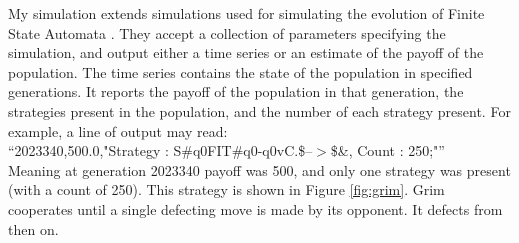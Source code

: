 \documentclass[a4paper,11pt,bcshonoursthesis,singlespace,oneside,thesisdraft,pdflatex]{cssethesis}
\begin{document}
My simulation extends simulations used for simulating the evolution of Finite State Automata \citep{van-veelen:PNAS:2012, jggit}. 
They accept a collection of parameters specifying the simulation, and output either a time series or an estimate of the payoff of the population. 
The time series contains the state of the population in specified generations. 
It reports the payoff of the population in that generation, the strategies present in the population, and the number of each strategy present. For example, a line of output may read:\\
``2023340,500.0,"Strategy : S\#q0FIT\#q0-q0vC.\$--$>$\$\&, Count : 250;"''\\
Meaning at generation 2023340 payoff was 500, and only one strategy was present (with a count of 250). 
This strategy is shown in Figure \ref{fig:grim}. 
Grim cooperates until a single defecting move is made by its opponent. 
It defects from then on. 
\end{document}
